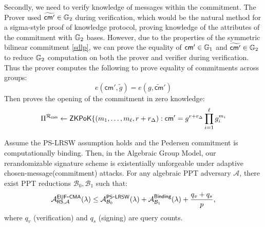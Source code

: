 Secondly, we need to verify knowledge of messages within the commitment. The Prover used $\widetilde{\mathsf{cm}'} \in \mathbb{G}_2$ during verification, which would be the natural method for a sigma-style proof of knowledge protocol, proving knowledge of the attributes of the commitment with $\mathbb{G}_2$ bases. However, due to the properties of the symmetric bilinear commitment \ref{sdlp}, we can prove the equality of $\mathsf{cm}' \in \mathbb{G}_1$ and $\widetilde{\mathsf{cm}'} \in \mathbb{G}_2$ to reduce $\mathbb{G}_2$ computation on both the prover and verifier during verification. 
Thus the prover computes the following to prove equality of commitments across groups:
\[
    e(\mathsf{cm}', \tilde{g}) = e(g, \widetilde{\mathsf{cm}}')
\]
Then proves the opening of the commitment in zero knowledge:
\[
 \Pi^{\mathcal{R}_{\mathsf{com}}}  \gets \mathsf{ZKPoK}\{(m_1,\ldots,m_\ell, r + r_\Delta): \mathsf{cm}' = g^{r + r_\Delta} \prod_{i=1}^\ell g_i^{m_i}
\]






\begin{theorem}
Assume the PS-LRSW assumption holds and the Pedersen commitment is computationally binding. Then, in the Algebraic Group Model, our rerandomizable signature scheme is existentially unforgeable under adaptive chosen-message(commitment) attacks. For any algebraic PPT adversary $\mathcal{A}$, there exist PPT reductions $\mathcal{B}_0, \mathcal{B}_1$ such that:
\[
\mathcal{A}^{\mathsf{EUF\mbox{-}CMA}}_{\mathsf{RS},\mathcal{A}}(\lambda) \leq \mathcal{A}^{\mathsf{PS\mbox{-}LRSW}}_{\mathcal{B}_0}(\lambda) + \mathcal{A}^{\mathsf{Binding}}_{\mathcal{B}_1}(\lambda) + \frac{q_v + q_s}{p},
\]
where $q_v$ (verification) and $q_s$ (signing) are query counts.
\end{theorem}

